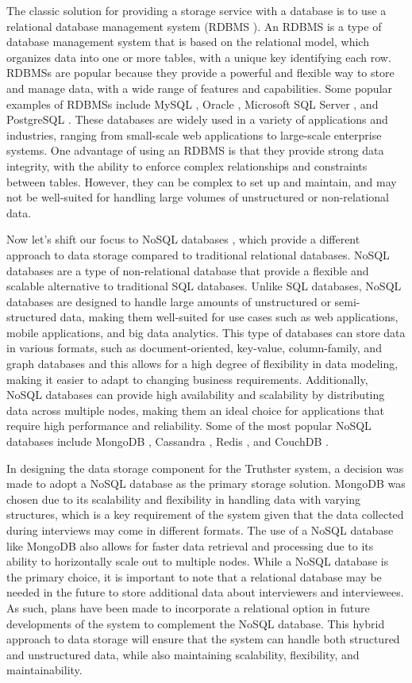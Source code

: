 \documentclass[target=mst,aauheader=]{thud}
\begin{document}
The classic solution for providing a storage service with a database is to use a relational database management system (RDBMS \cite{RDBMS}). An RDBMS is a type of database management system that is based on the relational model, which organizes data into one or more tables, with a unique key identifying each row. RDBMSs are popular because they provide a powerful and flexible way to store and manage data, with a wide range of features and capabilities. Some popular examples of RDBMSs include MySQL \cite{mySQL}, Oracle \cite{oracleDb}, Microsoft SQL Server \cite{microsoftSQL}, and PostgreSQL \cite{postgreSQL}. These databases are widely used in a variety of applications and industries, ranging from small-scale web applications to large-scale enterprise systems. One advantage of using an RDBMS is that they provide strong data integrity, with the ability to enforce complex relationships and constraints between tables. However, they can be complex to set up and maintain, and may not be well-suited for handling large volumes of unstructured or non-relational data.\par
Now let's shift our focus to NoSQL databases \cite{noSQL}, which provide a different approach to data storage compared to traditional relational databases. NoSQL databases are a type of non-relational database that provide a flexible and scalable alternative to traditional SQL databases. Unlike SQL databases, NoSQL databases are designed to handle large amounts of unstructured or semi-structured data, making them well-suited for use cases such as web applications, mobile applications, and big data analytics. This type of databases can store data in various formats, such as document-oriented, key-value, column-family, and graph databases and this allows for a high degree of flexibility in data modeling, making it easier to adapt to changing business requirements. Additionally, NoSQL databases can provide high availability and scalability by distributing data across multiple nodes, making them an ideal choice for applications that require high performance and reliability. Some of the most popular NoSQL databases include MongoDB \cite{mongoDB}, Cassandra \cite{cassandra}, Redis \cite{redis}, and CouchDB \cite{apacheCouch}.\par
In designing the data storage component for the Truthster system, a decision was made to adopt a NoSQL database as the primary storage solution. MongoDB was chosen due to its scalability and flexibility in handling data with varying structures, which is a key requirement of the system given that the data collected during interviews may come in different formats. The use of a NoSQL database like MongoDB also allows for faster data retrieval and processing due to its ability to horizontally scale out to multiple nodes. While a NoSQL database is the primary choice, it is important to note that a relational database may be needed in the future to store additional data about interviewers and interviewees. As such, plans have been made to incorporate a relational option in future developments of the system to complement the NoSQL database. This hybrid approach to data storage will ensure that the system can handle both structured and unstructured data, while also maintaining scalability, flexibility, and maintainability.\par
\end{document}
